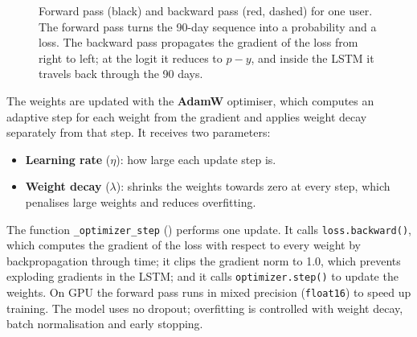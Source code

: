 \documentclass{article}
\begin{document}
\begin{figure}[H]
\caption{Forward pass (black) and backward pass (red, dashed) for one user. The forward pass turns the 90-day sequence into a probability and a loss. The backward pass propagates the gradient of the loss from right to left; at the logit it reduces to $\hat p - y$, and inside the LSTM it travels back through the 90 days.}
\label{fig:w2_backprop}
\end{figure}

The weights are updated with the \textbf{AdamW} optimiser, which computes an adaptive step for each weight from the gradient and applies weight decay separately from that step. It receives two parameters:
\begin{itemize}
    \item \textbf{Learning rate} ($\eta$): how large each update step is.
    \item \textbf{Weight decay} ($\lambda$): shrinks the weights towards zero at every step, which penalises large weights and reduces overfitting.
\end{itemize}

The function \texttt{\_optimizer\_step} () performs one update. It calls \texttt{loss.backward()}, which computes the gradient of the loss with respect to every weight by backpropagation through time; it clips the gradient norm to 1.0, which prevents exploding gradients in the LSTM; and it calls \texttt{optimizer.step()} to update the weights. On GPU the forward pass runs in mixed precision (\texttt{float16}) to speed up training. The model uses no dropout; overfitting is controlled with weight decay, batch normalisation and early stopping.
\end{document}
